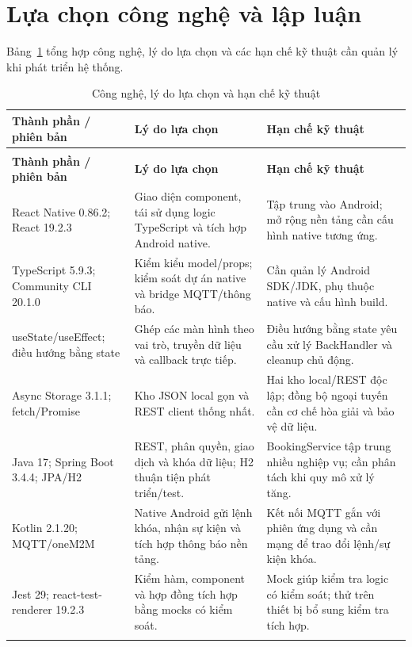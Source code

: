 \section{Lựa chọn công nghệ và lập luận}
Bảng~\ref{tab:technology} tổng hợp công nghệ, lý do lựa chọn và các hạn chế kỹ thuật cần quản lý khi phát triển hệ thống.
{\tabletext\renewcommand{\arraystretch}{1.04}\begin{longtable}{>{\raggedright\arraybackslash}p{}>{\raggedright\arraybackslash}p{}>{\raggedright\arraybackslash}p{}}
\caption{Công nghệ, lý do lựa chọn và hạn chế kỹ thuật}\label{tab:technology}\\
\toprule \textbf{Thành phần / phiên bản} & \textbf{Lý do lựa chọn} & \textbf{Hạn chế kỹ thuật}\\\midrule
\endfirsthead
\multicolumn{3}{l}{\small Công nghệ, lý do lựa chọn và hạn chế kỹ thuật (tiếp)}\\
\toprule \textbf{Thành phần / phiên bản} & \textbf{Lý do lựa chọn} & \textbf{Hạn chế kỹ thuật}\\\midrule
\endhead
\bottomrule\endlastfoot
React Native 0.86.2; React 19.2.3 \cite{reactnative} & Giao diện component, tái sử dụng logic TypeScript và tích hợp Android native. & Tập trung vào Android; mở rộng nền tảng cần cấu hình native tương ứng.\\\addlinespace[1.5pt]
TypeScript 5.9.3; Community CLI 20.1.0 & Kiểm kiểu model/props; kiểm soát dự án native và bridge MQTT/thông báo. & Cần quản lý Android SDK/JDK, phụ thuộc native và cấu hình build.\\\addlinespace[1.5pt]
useState/useEffect; điều hướng bằng state & Ghép các màn hình theo vai trò, truyền dữ liệu và callback trực tiếp. & Điều hướng bằng state yêu cầu xử lý BackHandler và cleanup chủ động.\\\addlinespace[1.5pt]
Async Storage 3.1.1; fetch/Promise \cite{asyncstorage} & Kho JSON local gọn và REST client thống nhất. & Hai kho local/REST độc lập; đồng bộ ngoại tuyến cần cơ chế hòa giải và bảo vệ dữ liệu.\\\addlinespace[1.5pt]
Java 17; Spring Boot 3.4.4; JPA/H2 & REST, phân quyền, giao dịch và khóa dữ liệu; H2 thuận tiện phát triển/test. & BookingService tập trung nhiều nghiệp vụ; cần phân tách khi quy mô xử lý tăng.\\\addlinespace[1.5pt]
Kotlin 2.1.20; MQTT/oneM2M & Native Android gửi lệnh khóa, nhận sự kiện và tích hợp thông báo nền tảng. & Kết nối MQTT gắn với phiên ứng dụng và cần mạng để trao đổi lệnh/sự kiện khóa.\\\addlinespace[1.5pt]
Jest 29; react-test-renderer 19.2.3 \cite{jest} & Kiểm hàm, component và hợp đồng tích hợp bằng mocks có kiểm soát. & Mock giúp kiểm tra logic có kiểm soát; thử trên thiết bị bổ sung kiểm tra tích hợp.\\\addlinespace[1.5pt]
\end{longtable}}

